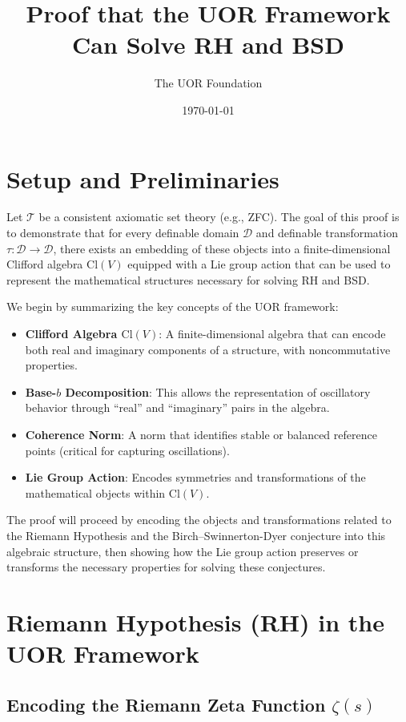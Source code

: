 \documentclass[11pt]{article}
\title{Proof that the UOR Framework Can Solve RH and BSD}
\author{The UOR Foundation}
\date{\today}
\begin{document}
\maketitle

\section{Setup and Preliminaries}

Let \(\mathcal{T}\) be a consistent axiomatic set theory (e.g., ZFC). The goal of this proof is to demonstrate that for every definable domain \(\mathcal{D}\) and definable transformation \(\tau: \mathcal{D} \to \mathcal{D}\), there exists an embedding of these objects into a finite-dimensional Clifford algebra \(\mathrm{Cl}(V)\) equipped with a Lie group action that can be used to represent the mathematical structures necessary for solving RH and BSD.

We begin by summarizing the key concepts of the UOR framework:

\begin{itemize}
    \item \textbf{Clifford Algebra \(\mathrm{Cl}(V)\)}: A finite-dimensional algebra that can encode both real and imaginary components of a structure, with noncommutative properties.
    \item \textbf{Base-\(b\) Decomposition}: This allows the representation of oscillatory behavior through “real” and “imaginary” pairs in the algebra.
    \item \textbf{Coherence Norm}: A norm that identifies stable or balanced reference points (critical for capturing oscillations).
    \item \textbf{Lie Group Action}: Encodes symmetries and transformations of the mathematical objects within \(\mathrm{Cl}(V)\).
\end{itemize}

The proof will proceed by encoding the objects and transformations related to the Riemann Hypothesis and the Birch–Swinnerton-Dyer conjecture into this algebraic structure, then showing how the Lie group action preserves or transforms the necessary properties for solving these conjectures.

\section{Riemann Hypothesis (RH) in the UOR Framework}

\subsection{Encoding the Riemann Zeta Function \(\zeta(s)\)}
\end{document}
